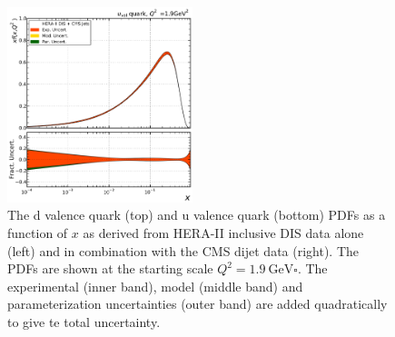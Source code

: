 \begin{figure}[tbp]
  \includegraphics[width=0.48\textwidth]{figures/pdf_constraints/hftd/HFTD_HERACMSTDJETS_V017_EIG/pdfratio/HFTD_HERACMSTDJETS_V017_EIG_8_1_9.pdf}
  \caption[The d valence and u valence quark PDFs]{The d valence quark (top) and u
    valence quark (bottom) PDFs as a function of $x$ as
  derived from HERA-II inclusive DIS data alone (left) and in combination with
  the CMS dijet data (right). The PDFs are shown at the starting scale $Q^2 =
  \SI{1.9}{\GeV \square}$. The experimental (inner band), model (middle band)
  and parameterization uncertainties (outer band) are added quadratically to give
  te total uncertainty.}
  \label{fig:pdfconstraints:split:dvaluval:19}
\end{figure}


